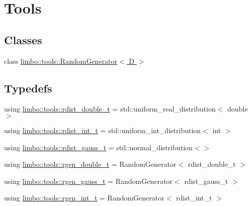 \hypertarget{group__tools}{}\section{Tools}
\label{group__tools}
\subsection*{Classes}
\begin{DoxyCompactItemize}
\item 
class \hyperlink{classlimbo_1_1tools_1_1_random_generator}{limbo\+::tools\+::\+Random\+Generator$<$ D $>$}
\end{DoxyCompactItemize}
\subsection*{Typedefs}
\begin{DoxyCompactItemize}
\item 
using \hyperlink{group__tools_gab2609bfef1e3bdb8b44c0d6c8c139927}{limbo\+::tools\+::rdist\+\_\+double\+\_\+t} = std\+::uniform\+\_\+real\+\_\+distribution$<$ double $>$
\item 
using \hyperlink{group__tools_gacb322b4600b2e500dbcd24661a749f49}{limbo\+::tools\+::rdist\+\_\+int\+\_\+t} = std\+::uniform\+\_\+int\+\_\+distribution$<$ int $>$
\item 
using \hyperlink{group__tools_ga38a794bf956d6bdd1e55f43357826b79}{limbo\+::tools\+::rdist\+\_\+gauss\+\_\+t} = std\+::normal\+\_\+distribution$<$$>$
\item 
using \hyperlink{group__tools_gacdb2963659056fc5fa9f94405f59a851}{limbo\+::tools\+::rgen\+\_\+double\+\_\+t} = Random\+Generator$<$ rdist\+\_\+double\+\_\+t $>$
\item 
using \hyperlink{group__tools_ga8d175579a371b13f2209fc21850c067b}{limbo\+::tools\+::rgen\+\_\+gauss\+\_\+t} = Random\+Generator$<$ rdist\+\_\+gauss\+\_\+t $>$
\item 
using \hyperlink{group__tools_ga3df78ebcb864be91e73e840bb42b9208}{limbo\+::tools\+::rgen\+\_\+int\+\_\+t} = Random\+Generator$<$ rdist\+\_\+int\+\_\+t $>$
\end{DoxyCompactItemize}
